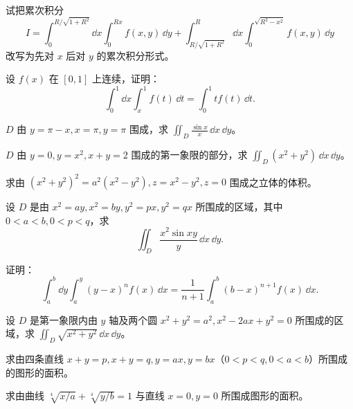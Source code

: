 \begin{xexercise}[1]
试把累次积分
  \[
    I=\int_0^{R/\sqrt{1+R^2}}\dd x\int_0^{Rx}f(x,y)\,\dd y
    +\int_{R/\sqrt{1+R^2}}^R\dd x\int_0^{\sqrt{R^2-x^2}}f(x,y)\,\dd y
  \]
  改写为先对 $x$ 后对 $y$ 的累次积分形式。
\end{xexercise}

\begin{xexercise}[2]
设 $f(x)$ 在 $[0,1]$ 上连续，证明：
  \[
    \int_0^1\dd x\int_x^1 f(t)\,\dd t=\int_0^1 t f(t)\,\dd t.
  \]
\end{xexercise}

\begin{xexercise}[3]
$D$ 由 $y=\pi-x,x=\pi,y=\pi$ 围成，求 $\displaystyle\iint_D\frac{\sin x}{x}\,\dd x\,\dd y$。
\end{xexercise}

\begin{xexercise}[4]
$D$ 由 $y=0,y=x^2,x+y=2$ 围成的第一象限的部分，求 $\displaystyle\iint_D(x^2+y^2)\,\dd x\,\dd y$。
\end{xexercise}

\begin{xexercise}[5]
求由 $(x^2+y^2)^2=a^2(x^2-y^2),z=x^2-y^2,z=0$ 围成之立体的体积。
\end{xexercise}

\begin{xexercise}[6]
设 $D$ 是由 $x^2=ay,x^2=by,y^2=px,y^2=qx$ 所围成的区域，其中 $0<a<b,0<p<q$，求
  \[
    \iint_D\frac{x^2\sin xy}{y}\,\dd x\,\dd y.
  \]
\end{xexercise}

\begin{xexercise}[7]
证明：
  \[
    \int_a^b\dd y\int_a^y(y-x)^n f(x)\,\dd x
    =\frac1{n+1}\int_a^b(b-x)^{n+1}f(x)\,\dd x.
  \]
\end{xexercise}

\begin{xexercise}[8]
设 $D$ 是第一象限内由 $y$ 轴及两个圆 $x^2+y^2=a^2,x^2-2ax+y^2=0$ 所围成的区域，求 $\displaystyle\iint_D\sqrt{x^2+y^2}\,\dd x\,\dd y$。
\end{xexercise}

\begin{xexercise}[9]
求由四条直线 $x+y=p,x+y=q,y=ax,y=bx$（$0<p<q,0<a<b$）所围成的图形的面积。
\end{xexercise}

\begin{xexercise}[10]
求由曲线 $\sqrt[4]{x/a}+\sqrt[4]{y/b}=1$ 与直线 $x=0,y=0$ 所围成图形的面积。
\end{xexercise}

